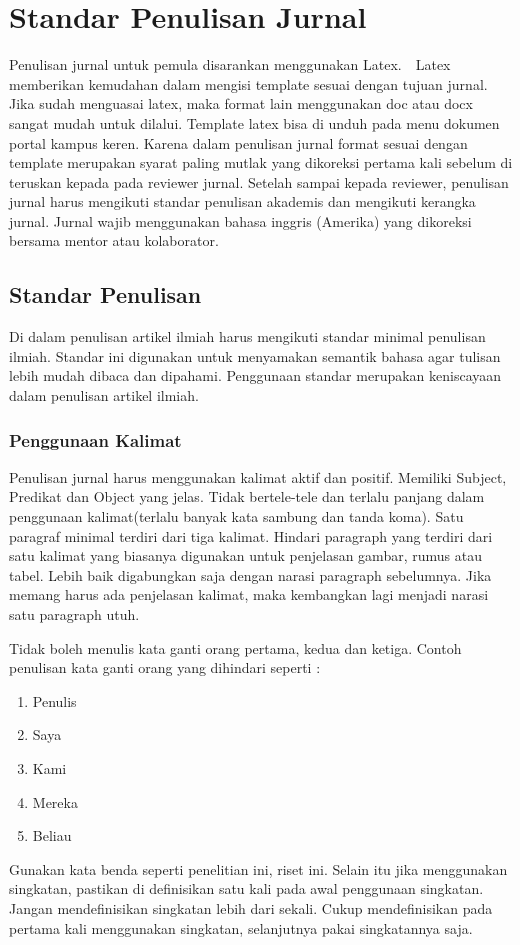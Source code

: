 \chapter{Standar Penulisan Jurnal}

Penulisan jurnal untuk pemula disarankan menggunakan Latex.　Latex memberikan kemudahan dalam mengisi template sesuai dengan tujuan jurnal. Jika sudah menguasai latex, maka format lain menggunakan doc atau docx sangat mudah untuk dilalui. Template latex bisa di unduh pada menu dokumen portal kampus keren. Karena dalam penulisan jurnal format sesuai dengan template merupakan syarat paling mutlak yang dikoreksi pertama kali sebelum di teruskan kepada pada reviewer jurnal. Setelah sampai kepada reviewer, penulisan jurnal harus mengikuti standar penulisan akademis dan mengikuti kerangka jurnal. Jurnal wajib menggunakan bahasa inggris (Amerika) yang dikoreksi bersama mentor atau kolaborator. 

\section{Standar Penulisan}
Di dalam penulisan artikel ilmiah harus mengikuti standar minimal penulisan ilmiah. Standar ini digunakan untuk menyamakan semantik bahasa agar tulisan lebih mudah dibaca dan dipahami. Penggunaan standar merupakan keniscayaan dalam penulisan artikel ilmiah.

\subsection{Penggunaan Kalimat}
Penulisan jurnal harus menggunakan kalimat aktif dan positif. Memiliki Subject, Predikat dan Object yang jelas. Tidak bertele-tele dan terlalu panjang dalam penggunaan kalimat(terlalu banyak kata sambung dan tanda koma). Satu paragraf minimal terdiri dari tiga kalimat. Hindari paragraph yang terdiri dari satu kalimat yang biasanya digunakan untuk penjelasan gambar, rumus atau tabel. Lebih baik digabungkan saja dengan narasi paragraph sebelumnya. Jika memang harus ada penjelasan kalimat, maka kembangkan lagi menjadi narasi satu paragraph utuh. 

Tidak boleh menulis kata ganti orang pertama, kedua dan ketiga. Contoh penulisan kata ganti orang yang dihindari seperti :
\begin{enumerate}
 \item Penulis
 \item Saya
 \item Kami
 \item Mereka 
 \item Beliau
\end{enumerate}
Gunakan kata benda seperti penelitian ini, riset ini. Selain itu jika menggunakan singkatan, pastikan di definisikan satu kali pada awal penggunaan singkatan. Jangan mendefinisikan singkatan lebih dari sekali. Cukup mendefinisikan pada pertama kali menggunakan singkatan, selanjutnya pakai singkatannya saja. 

